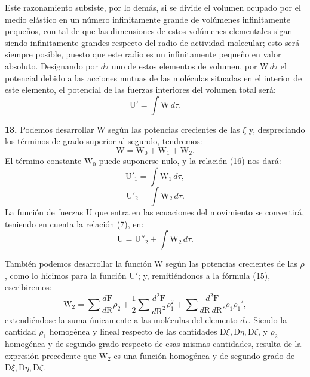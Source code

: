 Este razonamiento subsiste, por lo demás, si se divide el volumen ocupado
por el medio elástico en un número infinitamente grande de volúmenes
infinitamente pequeños, con tal de que las dimensiones de estos volúmenes
elementales sigan siendo infinitamente grandes respecto del radio de
actividad molecular; esto será siempre posible, puesto que este radio es un
infinitamente pequeño en valor absoluto. Designando por $d\tau$ uno de
estos elementos de volumen, por $\mathrm{W}\,d\tau$ el potencial debido a
las acciones mutuas de las moléculas situadas en el interior de este
elemento, el potencial de las fuerzas interiores del volumen total será:
\begin{equation}
\mathrm{U}'=\int \mathrm{W}\,d\tau.
\tag{16}
\end{equation}

\noindent\textbf{13.} Podemos desarrollar $\mathrm{W}$ según las potencias
crecientes de las $\xi$ y, despreciando los términos de grado superior al
segundo, tendremos:
\[
\mathrm{W}=\mathrm{W}_0+\mathrm{W}_1+\mathrm{W}_2.
\]
El término constante $\mathrm{W}_0$ puede suponerse nulo, y la relación
(16) nos dará:
\begin{equation}
\mathrm{U}'_1=\int \mathrm{W}_1\,d\tau,
\tag{17}
\end{equation}
\begin{equation}
\mathrm{U}'_2=\int \mathrm{W}_2\,d\tau.
\tag{18}
\end{equation}
La función de fuerzas $\mathrm{U}$ que entra en las ecuaciones del
movimiento se convertirá, teniendo en cuenta la relación (7), en:
\begin{equation}
\mathrm{U}=\mathrm{U}''_2+\int \mathrm{W}_2\,d\tau.
\tag{19}
\end{equation}

También podemos desarrollar la función $\mathrm{W}$ según las potencias
crecientes de las $\rho$, como lo hicimos para la función $\mathrm{U}'$; y,
remitiéndonos a la fórmula (15), escribiremos:
\begin{equation}
\mathrm{W}_2=\sum\frac{d\mathrm{F}}{d\mathrm{R}}\rho_2
+\frac12\sum\frac{d^2\mathrm{F}}{d\mathrm{R}^2}\rho_1^2
+\sum\frac{d^2\mathrm{F}}{d\mathrm{R}\,d\mathrm{R}'}\rho_1\rho_1',
\tag{20}
\end{equation}
extendiéndose la suma únicamente a las moléculas del elemento $d\tau$.
Siendo la cantidad $\rho_1$ homogénea y lineal respecto de las cantidades
$\mathrm{D}\xi,\mathrm{D}\eta,\mathrm{D}\zeta$, y $\rho_2$ homogénea y de
segundo grado respecto de esas mismas cantidades, resulta de la expresión
precedente que $\mathrm{W}_2$ es una función homogénea y de segundo grado
de $\mathrm{D}\xi,\mathrm{D}\eta,\mathrm{D}\zeta$.

